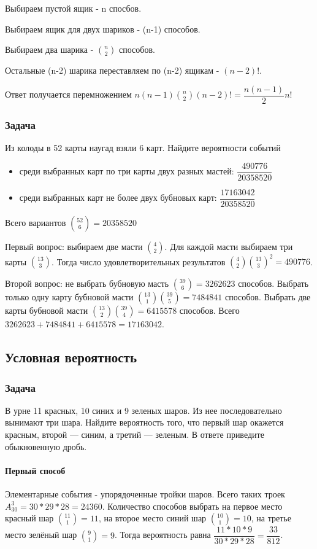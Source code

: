 \documentclass[a4paper,12pt]{article}
\begin{document}
Выбираем пустой ящик - n спосбов.

Выбираем ящик для двух шариков - (n-1) способов.

Выбираем два шарика - \(\binom{n}{2}\) способов.

Остальные (n-2) шарика переставляем по (n-2) ящикам - \((n-2)!\).

Ответ получается перемножением \(n(n-1)\binom{n}{2}(n-2)!=\dfrac{n(n-1)}{2}n!\)

\subsubsection*{Задача}
Из колоды в 52 карты наугад взяли 6 карт. Найдите вероятности событий
\begin{itemize}
	\item среди выбранных карт по три карты двух разных мастей: \(\dfrac{490776}{20358520}\)
	\item среди выбранных карт не более двух бубновых карт: \(\dfrac{17163042}{20358520}\)
\end{itemize}

Всего вариантов \(\binom{52}{6}=20358520\)

Первый вопрос: выбираем две масти \(\binom{4}{2}\). Для каждой масти выбираем три карты \(\binom{13}{3}\). Тогда число удовлетворительных результатов \(\binom{4}{2}\binom{13}{3}^2=490776\).

Второй вопрос: не выбрать бубновую масть \(\binom{39}{6}=3262623\) способов. Выбрать только одну карту бубновой масти \(\binom{13}{1}\binom{39}{5}=7484841\) способов. Выбрать две карты бубновой масти \(\binom{13}{2}\binom{39}{4}=6415578\) способов. Всего \(3262623+7484841+6415578=17163042\).


\subsection{Условная вероятность}
\subsubsection*{Задача}
В урне 11 красных, 10 синих и 9 зеленых шаров. Из нее последовательно вынимают три шара. Найдите вероятность того, что первый шар окажется красным, второй — синим, а третий — зеленым. В ответе приведите обыкновенную дробь.

\paragraph{Первый способ}
Элементарные события - упорядоченные тройки шаров. Всего таких троек \(A_{30}^3=30*29*28=24360\). Количество способов выбрать на первое место красный шар \(\binom{11}{1}=11\), на второе место синий шар \(\binom{10}{1}=10\), на третье место зелёный шар \(\binom{9}{1}=9\). Тогда вероятность равна \(\dfrac{11*10*9}{30*29*28}=\dfrac{33}{812}\).
\end{document}
